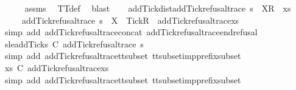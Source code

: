 \begin{isabellebody}
\ \ \ \ \isamarkupfalse%
\ assms\ \isamarkupfalse%
\ TT{}{\isacharunderscore}def\ \isamarkupfalse%
\ blast\isanewline
\isanewline
\ \ \isamarkupfalse%
\ add{\isacharunderscore}Tick{\isacharunderscore}dist{\isacharcolon}{\isachardoublequoteopen}add{\isacharunderscore}Tick{\isacharunderscore}refusal{\isacharunderscore}trace\ {\isacharparenleft}s\ {\isacharat}\ {\isacharbrackleft}{\isacharbrackleft}X{\isacharbrackright}\isactrlsub R{\isacharbrackright}\ {\isacharat}\ xs{\isacharparenright}\ {\isacharequal}\isanewline
\ \ \ \ \ add{\isacharunderscore}Tick{\isacharunderscore}refusal{\isacharunderscore}trace\ s\ {\isacharat}\ {\isacharbrackleft}{\isacharbrackleft}X\ {\isasymunion}\ {\isacharbraceleft}Tick{\isacharbraceright}{\isacharbrackright}\isactrlsub R{\isacharbrackright}\ {\isacharat}\ add{\isacharunderscore}Tick{\isacharunderscore}refusal{\isacharunderscore}trace{\isacharparenleft}xs{\isacharparenright}{\isachardoublequoteclose}\isanewline
\ \ \ \ \isamarkupfalse%
\ {\isacharparenleft}simp\ add{\isacharcolon}\ add{\isacharunderscore}Tick{\isacharunderscore}refusal{\isacharunderscore}trace{\isacharunderscore}concat\ add{\isacharunderscore}Tick{\isacharunderscore}refusal{\isacharunderscore}trace{\isacharunderscore}end{\isacharunderscore}refusal{\isacharparenright}\isanewline
\ \ \isanewline
\ \ \isamarkupfalse%
\ s{\isacharunderscore}le{\isacharunderscore}addTick{\isacharcolon}{\isachardoublequoteopen}s\ {\isasymlesssim}\isactrlsub C\ add{\isacharunderscore}Tick{\isacharunderscore}refusal{\isacharunderscore}trace\ s{\isachardoublequoteclose}\isanewline
\ \ \ \ \isamarkupfalse%
\ {\isacharparenleft}simp\ add{\isacharcolon}\ add{\isacharunderscore}Tick{\isacharunderscore}refusal{\isacharunderscore}trace{\isacharunderscore}tt{\isacharunderscore}subset\ tt{\isacharunderscore}subset{\isacharunderscore}imp{\isacharunderscore}prefix{\isacharunderscore}subset{\isacharparenright}\isanewline
\ \ \isamarkupfalse%
\ {\isachardoublequoteopen}xs\ {\isasymlesssim}\isactrlsub C\ add{\isacharunderscore}Tick{\isacharunderscore}refusal{\isacharunderscore}trace{\isacharparenleft}xs{\isacharparenright}{\isachardoublequoteclose}\isanewline
\ \ \ \ \isamarkupfalse%
\ {\isacharparenleft}simp\ add{\isacharcolon}\ add{\isacharunderscore}Tick{\isacharunderscore}refusal{\isacharunderscore}trace{\isacharunderscore}tt{\isacharunderscore}subset\ tt{\isacharunderscore}subset{\isacharunderscore}imp{\isacharunderscore}prefix{\isacharunderscore}subset{\isacharparenright}\isanewline

\end{isabellebody}
